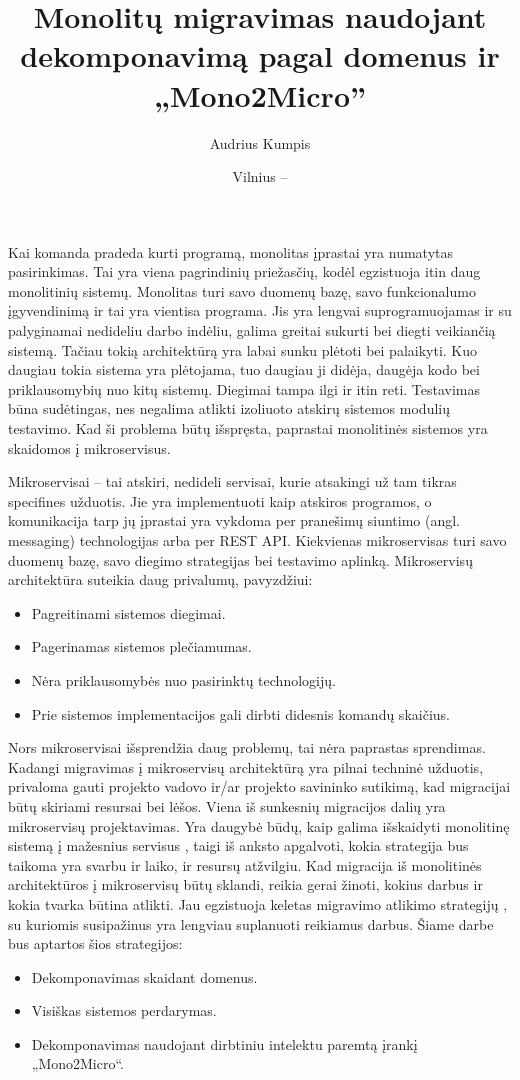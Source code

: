 \documentclass{VUMIFPSbakalaurinis}
\institute{Informatikos institutas}  %
\title{Monolitų migravimas naudojant dekomponavimą pagal domenus ir „Mono2Micro”}
\author{Audrius Kumpis}
\date{Vilnius – \the\year}
\begin{document}
\maketitle

Kai komanda pradeda kurti programą, monolitas įprastai yra numatytas pasirinkimas. Tai yra viena pagrindinių priežasčių, kodėl egzistuoja itin daug monolitinių sistemų. Monolitas turi savo duomenų bazę, savo funkcionalumo įgyvendinimą ir tai yra vientisa programa. Jis yra lengvai suprogramuojamas ir su palyginamai nedideliu darbo indėliu, galima greitai sukurti bei diegti veikiančią sistemą. Tačiau tokią architektūrą yra labai sunku plėtoti bei palaikyti. Kuo daugiau  tokia sistema yra plėtojama, tuo daugiau ji didėja, daugėja kodo bei priklausomybių nuo kitų sistemų. Diegimai tampa ilgi ir itin reti. Testavimas būna sudėtingas, nes negalima atlikti izoliuoto atskirų sistemos modulių testavimo. Kad ši problema būtų išspręsta, paprastai monolitinės sistemos yra skaidomos į mikroservisus.

Mikroservisai – tai atskiri, nedideli servisai, kurie atsakingi už tam tikras specifines užduotis. Jie yra implementuoti kaip atskiros programos, o komunikacija tarp jų įprastai yra vykdoma per pranešimų siuntimo (angl. messaging) technologijas arba per REST API. Kiekvienas mikroservisas turi savo duomenų bazę, savo diegimo strategijas bei testavimo aplinką. Mikroservisų architektūra suteikia daug privalumų, pavyzdžiui:
\begin{itemize}
    \item Pagreitinami sistemos diegimai.
    \item Pagerinamas sistemos plečiamumas.
    \item Nėra priklausomybės nuo pasirinktų technologijų.
    \item Prie sistemos implementacijos gali dirbti didesnis komandų skaičius.
\end{itemize}

Nors mikroservisai išsprendžia daug problemų, tai nėra paprastas sprendimas. Kadangi migravimas į mikroservisų architektūrą yra pilnai techninė užduotis, privaloma gauti projekto vadovo ir/ar projekto savininko sutikimą, kad migracijai būtų skiriami resursai bei lėšos. Viena iš sunkesnių migracijos dalių yra mikroservisų projektavimas. Yra daugybė būdų, kaip galima išskaidyti monolitinę sistemą į mažesnius servisus \cite{FBZ+19}, taigi iš anksto apgalvoti, kokia strategija bus taikoma yra svarbu ir laiko, ir resursų atžvilgiu. Kad migracija iš monolitinės architektūros į mikroservisų būtų sklandi, reikia gerai žinoti, kokius darbus ir kokia tvarka būtina atlikti. Jau egzistuoja keletas migravimo atlikimo strategijų \cite{Wal22,MQO18,KXL+20}, su kuriomis susipažinus yra lengviau suplanuoti reikiamus darbus. Šiame darbe bus aptartos šios strategijos:
\begin{itemize}
    \item Dekomponavimas skaidant domenus.
    \item Visiškas sistemos perdarymas.
    \item Dekomponavimas naudojant dirbtiniu intelektu paremtą įrankį „Mono2Micro“.
\end{itemize}
\end{document}
